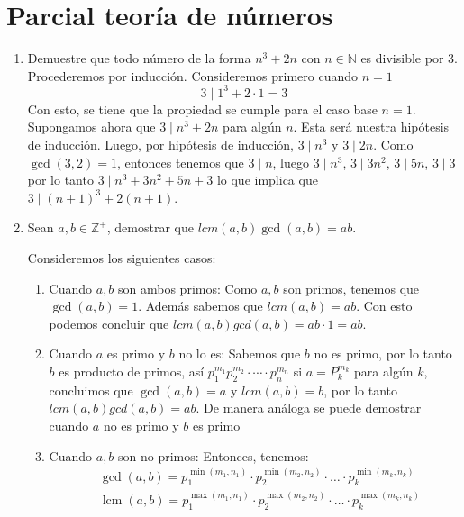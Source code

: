 \documentclass{report}
\begin{document}

    \section*{Parcial teoría de números}

    \begin{enumerate}
        \item Demuestre que todo número de la forma $n^3 + 2n$ con $n \in \mathbb{N}$ es divisible por $3$.
        Procederemos por inducción. Consideremos primero cuando $n = 1$
        $$3 \mid 1^3 + 2\cdot 1 = 3$$
        Con esto, se tiene que la propiedad se cumple para el caso base $n = 1$. Supongamos ahora que $3 \mid n^3 + 2n$ para algún $n$. Esta será nuestra hipótesis de inducción. Luego, por hipótesis de inducción, $3 \mid n^3$ y $3 \mid 2n$. Como $\gcd(3, 2) = 1$, entonces tenemos que $3 \mid n$, luego $3 \mid n^3$, $3 \mid 3n^2$, $3 \mid 5n$, $3 \mid 3$ por lo tanto $3 \mid n^3+3n^2+5n+3$ lo que implica que $3 \mid (n+1)^3 + 2(n+1)$.

        \item Sean $a,b \in \mathbb{Z}^+$, demostrar que $lcm(a, b)\gcd(a,b) = ab$.

        Consideremos los siguientes casos:

        \begin{enumerate}
            \item Cuando $a,b$ son ambos primos:
            Como $a, b$ son primos, tenemos que $\gcd(a,b) = 1$. Además sabemos que $lcm(a,b) = ab$. Con esto podemos concluir que $lcm(a, b)gcd(a,b) = ab \cdot 1 = ab$.
            \item Cuando $a$ es primo y $b$ no lo es:
            Sabemos que $b$ no es primo, por lo tanto $b$ es producto de primos, así $p_1^{m_1}p_2^{m_2}\cdot \cdots \cdot p_n^{m_n}$ si $a = P_k^{m_k}$ para algún $k$, concluimos que $\gcd(a,b) = a$ y $lcm(a,b) = b$, por lo tanto $lcm(a, b)gcd(a,b) = ab$. De manera análoga se puede demostrar cuando $a$ no es primo y $b$ es primo
            \item Cuando $a, b$ son no primos:
            Entonces, tenemos:
            \begin{align*}
            & \gcd(a, b) = p_1^{\min(m_1, n_1)} \cdot p_2^{\min(m_2, n_2)} \cdot \ldots \cdot p_k^{\min(m_k, n_k)} \\
            & \operatorname{lcm}(a, b) = p_1^{\max(m_1, n_1)} \cdot p_2^{\max(m_2, n_2)} \cdot \ldots \cdot p_k^{\max(m_k, n_k)}
            \end{align*}


\end{enumerate}
\end{enumerate}
\end{document}
